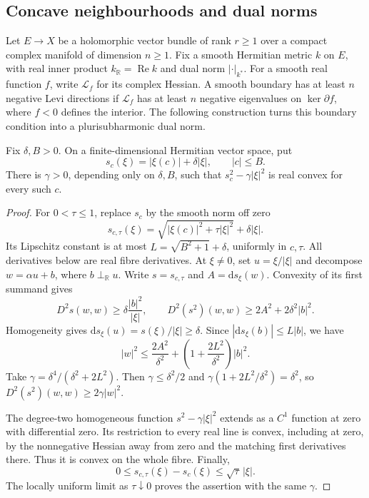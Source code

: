 \subsection{Concave neighbourhoods and dual norms}
\label{subsec:concave-neighbourhood-dual-norms}

Let $E\to X$ be a holomorphic vector bundle of rank $r\geq1$ over a compact complex manifold of dimension $n\geq1$. Fix a smooth Hermitian metric $k$ on $E$, with real inner product $k_{\mathbb R}=\operatorname{Re}k$ and dual norm $|\cdot|_{k^*}$. For a smooth real function $f$, write $\mathcal L_f$ for its complex Hessian. A smooth boundary has at least $n$ negative Levi directions if $\mathcal L_f$ has at least $n$ negative eigenvalues on $\ker\partial f$, where $f<0$ defines the interior. The following construction turns this boundary condition into a plurisubharmonic dual norm.

\begin{lemma}\label{lem:ball-support-uniform-convexity}
Fix $\delta,B>0$. On a finite-dimensional Hermitian vector space, put
\[
 s_c(\xi)=|\xi(c)|+\delta|\xi|,\qquad |c|\leq B.
\]
There is $\gamma>0$, depending only on $\delta,B$, such that $s_c^2-\gamma|\xi|^2$ is real convex for every such $c$.
\end{lemma}
\begin{proof}
For $0<\tau\leq1$, replace $s_c$ by the smooth norm off zero
\[
 s_{c,\tau}(\xi)=\sqrt{|\xi(c)|^2+\tau|\xi|^2}+\delta|\xi|.
\]
Its Lipschitz constant is at most $L=\sqrt{B^2+1}+\delta$, uniformly in $c,\tau$. All derivatives below are real fibre derivatives. At $\xi\ne0$, set $u=\xi/|\xi|$ and decompose $w=\alpha u+b$, where $b\perp_{\mathbb R}u$. Write $s=s_{c,\tau}$ and $A=\mathrm ds_\xi(w)$. Convexity of its first summand gives
\[
 D^2s(w,w)\geq\delta\frac{|b|^2}{|\xi|},\qquad
 D^2(s^2)(w,w)\geq2A^2+2\delta^2|b|^2.
\]
Homogeneity gives $\mathrm ds_\xi(u)=s(\xi)/|\xi|\geq\delta$. Since $|\mathrm ds_\xi(b)|\leq L|b|$, we have
\[
 |w|^2\leq\frac{2A^2}{\delta^2}
       +\left(1+\frac{2L^2}{\delta^2}\right)|b|^2.
\]
Take $\gamma=\delta^4/(\delta^2+2L^2)$. Then $\gamma\leq\delta^2/2$ and $\gamma(1+2L^2/\delta^2)=\delta^2$, so $D^2(s^2)(w,w)\geq2\gamma|w|^2$.

The degree-two homogeneous function $s^2-\gamma|\xi|^2$ extends as a $C^1$ function at zero with differential zero. Its restriction to every real line is convex, including at zero, by the nonnegative Hessian away from zero and the matching first derivatives there. Thus it is convex on the whole fibre. Finally,
\[
 0\leq s_{c,\tau}(\xi)-s_c(\xi)\leq\sqrt\tau\,|\xi|.
\]
The locally uniform limit as $\tau\downarrow0$ proves the assertion with the same $\gamma$.
\end{proof}

